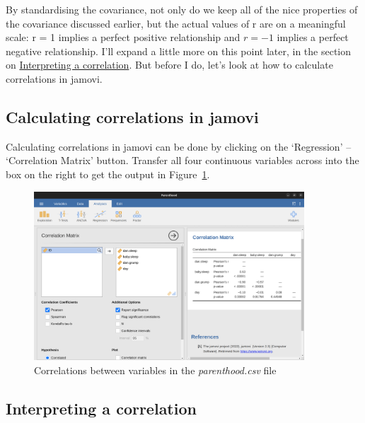 \documentclass[
  a4paper,
]{book}
\begin{document}
By standardising the covariance, not only do we keep all of the nice
properties of the covariance discussed earlier, but the actual values of
r are on a meaningful scale: r = 1 implies a perfect positive
relationship and \(r = -1\) implies a perfect negative relationship.
I'll expand a little more on this point later, in the section on
\protect\hyperlink{interpreting-a-correlation}{Interpreting a
correlation}. But before I do, let's look at how to calculate
correlations in jamovi.

\hypertarget{calculating-correlations-in-jamovi}{%
\subsection{Calculating correlations in
jamovi}\label{calculating-correlations-in-jamovi}}

Calculating correlations in jamovi can be done by clicking on the
`Regression' -- `Correlation Matrix' button. Transfer all four
continuous variables across into the box on the right to get the output
in Figure~\ref{fig-fig12-5}.

\begin{figure}[h!]

\includegraphics[width=0.9\textwidth,height=\textheight]{images/fig12-5.png} \hfill{}

\caption{\label{fig-fig12-5}Correlations between variables in the
\emph{parenthood.csv} file}

\end{figure}

\hypertarget{interpreting-a-correlation}{%
\subsection{Interpreting a
correlation}\label{interpreting-a-correlation}}
\end{document}
